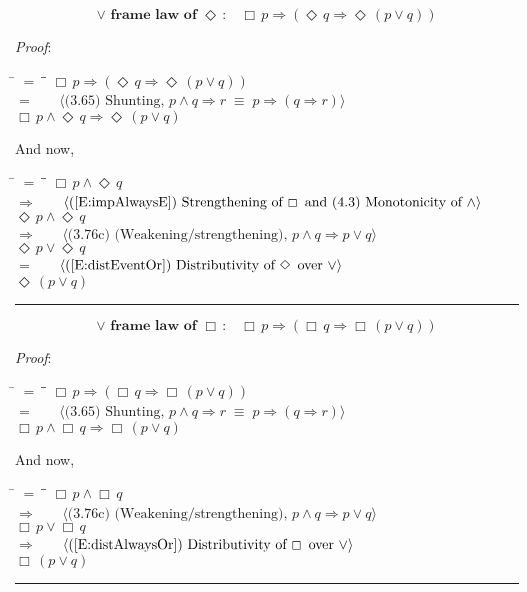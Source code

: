 \documentclass[12pt, fleqn, leqno]{article}
\newcommand{\lgap}{2pt}                             %
\newcommand{\mymathindent}{24pt}                    %
\newcommand{\equivs}{\ensuremath{\;\equiv\;}}       %
\newcommand{\impl}{\ensuremath{\Rightarrow}}        %
\newcommand{\Event}{\Diamond\,}
\newcommand{\Always}{\Box\,}
\newcommand{\myqed}{\rule[-.23ex]{1.2ex}{2.0ex}}
\newcommand{\myqedtab}{\hspace{384pt}}              %
\newcommand{\Gll} {\langle}                         %
\newcommand{\Ggg} {\rangle}                         %
\newcommand{\Hint}[1]     {\ \ \ $\Gll              \mbox{#1} \Ggg$ }   %
\begin{document}
\begin{equation}\label{E:disjframelawEvent}
\textbf{$\lor$ frame law of $\Event$:}\quad \Always p \impl (\Event q \impl \Event (p \lor q))
\end{equation}

\emph{Proof}:
\begin{tabbing}
\hspace{\mymathindent} \= $= \;$ \= \myqedtab \= \kill
  \> \>   $\Always p \impl (\Event q \impl \Event (p \lor q))$\\[\lgap]
  \> $=$  \>  \Hint{(3.65) Shunting, $p\land q\impl r\equivs p\impl (q\impl r)$}\\[\lgap]
  \> \>   $\Always p \land \Event q \impl \Event (p \lor q)$
\end{tabbing}
And now,
\begin{tabbing}
\hspace{\mymathindent} \= $= \;$ \= \myqedtab \= \kill
  \> \>   $\Always p \land \Event q $\\[\lgap]
  \> $\impl$  \>  \Hint{(\ref{E:impAlwaysE}) Strengthening of $\Always$ and (4.3) Monotonicity of $\land$}\\[\lgap]
  \> \>   $\Event p \land \Event q $\\[\lgap]
   \> $\impl$ \> \Hint{(3.76c) (Weakening/strengthening), $p\land q \impl p \lor q$} \\[\lgap]
   \> \>   $\Event p \lor \Event q $\\[\lgap]
  \> $=$  \>  \Hint{(\ref{E:distEventOr}) Distributivity of $\Event$ over $\lor$}\\[\lgap]
  \> \>   $\Event (p \lor q)$\quad \myqed
\end{tabbing}

\begin{equation}\label{E:disjframelawAlways}
\textbf{$\lor$ frame law of $\Always$:}\quad \Always p \impl (\Always q \impl \Always (p \lor q))
\end{equation}

\emph{Proof}:
\begin{tabbing}
\hspace{\mymathindent} \= $= \;$ \= \myqedtab \= \kill
  \> \>   $\Always p \impl (\Always q \impl \Always (p \lor q))$\\[\lgap]
  \> $=$  \>  \Hint{(3.65) Shunting, $p\land q\impl r\equivs p\impl (q\impl r)$}\\[\lgap]
  \> \>   $\Always p \land \Always q \impl \Always (p \lor q)$
\end{tabbing}
And now,
\begin{tabbing}
\hspace{\mymathindent} \= $= \;$ \= \myqedtab \= \kill
  \> \>   $\Always p \land \Always q $\\[\lgap]
   \> $\impl$ \> \Hint{(3.76c) (Weakening/strengthening), $p\land q \impl p \lor q$} \\[\lgap]
   \> \>   $\Always p \lor \Always q $\\[\lgap]
  \> $\impl$  \>  \Hint{(\ref{E:distAlwaysOr}) Distributivity of $\Always$ over $\lor$}\\[\lgap]
  \> \>   $\Always (p \lor q)$\quad \myqed
\end{tabbing}
\end{document}
